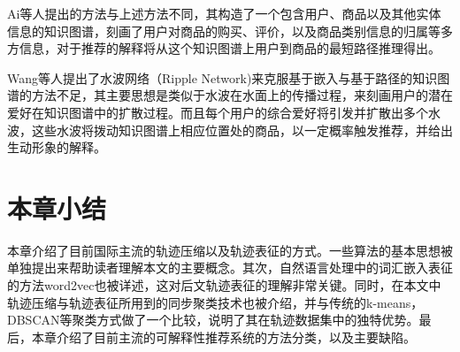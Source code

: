 Ai等人提出的方法与上述方法不同，其构造了一个包含用户、商品以及其他实体信息的知识图谱，刻画了用户对商品的购买、评价，以及商品类别信息的归属等多方信息，对于推荐的解释将从这个知识图谱上用户到商品的最短路径推理得出。

Wang等人提出了水波网络（Ripple Network)来克服基于嵌入与基于路径的知识图谱的方法不足，其主要思想是类似于水波在水面上的传播过程，来刻画用户的潜在爱好在知识图谱中的扩散过程。而且每个用户的综合爱好将引发并扩散出多个水波，这些水波将拨动知识图谱上相应位置处的商品，以一定概率触发推荐，并给出生动形象的解释。

\section{本章小结}
本章介绍了目前国际主流的轨迹压缩以及轨迹表征的方式。一些算法的基本思想被单独提出来帮助读者理解本文的主要概念。其次，自然语言处理中的词汇嵌入表征的方法word2vec也被详述，这对后文轨迹表征的理解非常关键。同时，在本文中轨迹压缩与轨迹表征所用到的同步聚类技术也被介绍，并与传统的k-means，DBSCAN等聚类方式做了一个比较，说明了其在轨迹数据集中的独特优势。最后，本章介绍了目前主流的可解释性推荐系统的方法分类，以及主要缺陷。

